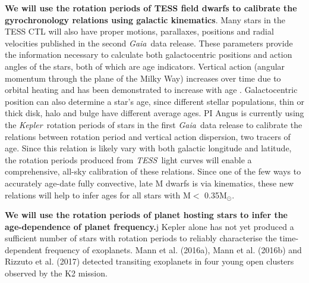 \documentclass[useAMS, usenatbib, preprint, 12pt]{aastex}
\newcommand{\Kepler}{{\it Kepler}}
\newcommand{\kepler}{\Kepler}
\newcommand{\TESS}{{\it TESS}}
\newcommand{\Gaia}{{\it Gaia}}
\newcommand{\eg}{{\it e.g.}}
\begin{document}
{\bf We will use the rotation periods of TESS field dwarfs to calibrate the
gyrochronology relations using galactic kinematics}.
Many stars in the TESS CTL will also have proper motions, parallaxes,
positions and radial velocities published in the second \Gaia\ data release.
These parameters provide the information necessary to calculate both
galactocentric positions and action angles of the stars, both of which are age
indicators.
Vertical action (angular momentum through the plane of the Milky Way)
increases over time due to orbital heating and has been demonstrated to
increase with age \citep[\eg][]{west2011}.
Galactocentric position can also determine a star's age, since different
stellar populations, thin or thick disk, halo and bulge have different average
ages.
PI Angus is currently using the \kepler\ rotation periods of stars in the
first \Gaia\ data release to calibrate the relations between rotation period
and vertical action dispersion, two tracers of age.
Since this relation is likely vary with both galactic longitude and latitude,
the rotation periods produced from \TESS\ light curves will enable a
comprehensive, all-sky calibration of these relations.
Since one of the few ways to accurately age-date fully convective, late M
dwarfs is via kinematics, these new relations will help to infer ages for all
stars with M$<$ 0.35M$_\odot$.

{\bf We will use the rotation periods of planet hosting stars to infer
the age-dependence of planet frequency.}j Kepler alone has not yet produced a
sufficient number of stars with rotation periods to reliably characterise the
time-dependent frequency of exoplanets.
Mann et al. (2016a), Mann et al. (2016b) and Rizzuto et al. (2017) detected
transiting exoplanets in four young open clusters observed by the K2 mission.
\end{document}
